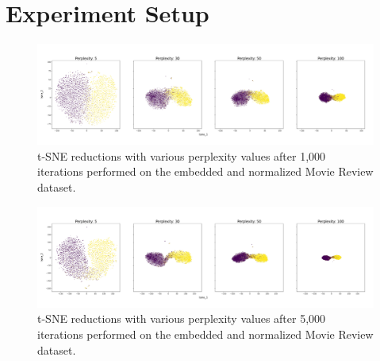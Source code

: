 \documentclass[english,bachelor,ul]{webisthesis} %
\begin{document}
\section{Experiment Setup}



\iffalse
\begin{figure}[htbp]
    \centering
    \includegraphics[width=1\textwidth]{img/reductions-mr-1000.jpg}
    \caption{t-SNE reductions with various perplexity values after 1,000 iterations performed on the embedded and normalized Movie Review dataset.}
    \label{fig:reductions-mr-1000}
\end{figure}

\begin{figure}[htbp]
    \centering
    \includegraphics[width=1\textwidth]{img/reductions-mr-5000.jpg}
    \caption{t-SNE reductions with various perplexity values after 5,000 iterations performed on the embedded and normalized Movie Review dataset.}
    \label{fig:reductions-mr-5000}
\end{figure}
\end{document}
